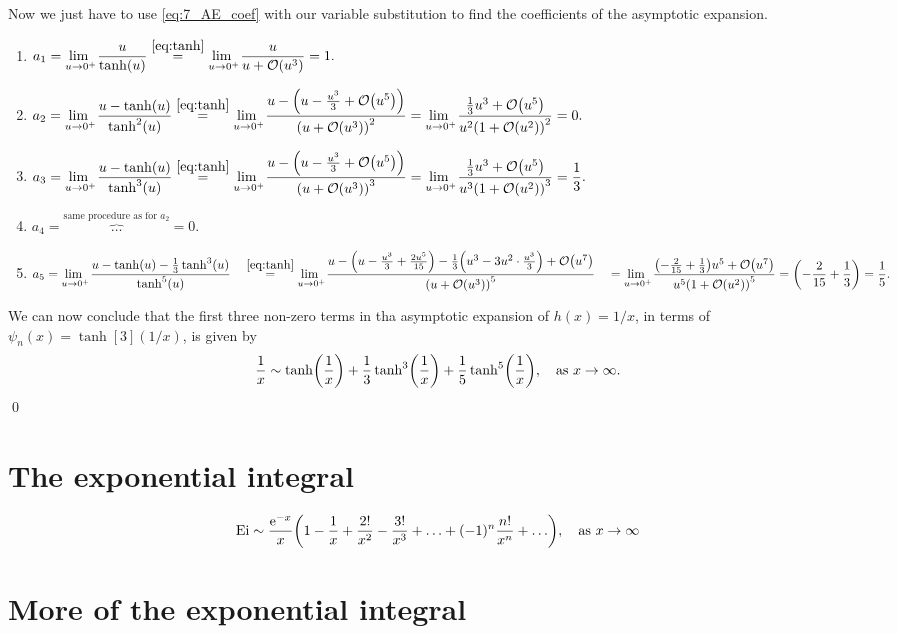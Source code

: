 \documentclass[11pt,letter, swedish, english
]{article}
\newcommand{\Ei}{\ensuremath\mathrm{Ei}}
\begin{document}
Now we just have to use \eqref{eq:7_AE_coef} with our variable
substitution to find the coefficients of the asymptotic expansion.
\begin{enumerate}
\item $\displaystyle a_1=\limu\frac{u}{\tanh(u)}
\stackrel{\eqref{eq:tanh}}{=}\limu \frac{u}{u+\order{u^3}} = 1.
$
\item $\displaystyle a_2=\limu\frac{u-\tanh(u)}{\tanh^2(u)}
\stackrel{\eqref{eq:tanh}}{=}\limu 
\frac{u-\qty(u-\frac{u^3}{3} + \order{u^5})}{\qty(u+\order{u^3})^2} 
=\limu 
\frac{\frac{1}{3}u^3 + \order{u^5}}{u^2\qty(1+\order{u^2})^2}= 0.
$
\item $\displaystyle a_3=\limu\frac{u-\tanh(u)}{\tanh^3(u)}
\stackrel{\eqref{eq:tanh}}{=}\limu 
\frac{u-\qty(u-\frac{u^3}{3} + \order{u^5})}{\qty(u+\order{u^3})^3} 
=\limu 
\frac{\frac{1}{3}u^3 + \order{u^5}}{u^3\qty(1+\order{u^2})^3}= \frac{1}{3}.
$
\item $\displaystyle a_4=
\overbrace{\ldots}^{\text{same procedure as for }a_2}= 0.
$
\item $\displaystyle a_5=\limu\frac{u-\tanh(u)-\frac{1}{3}\tanh^3(u)}{\tanh^5(u)}
\\\phantom{a_5}\stackrel{\eqref{eq:tanh}}{=}\limu 
\frac{u-\qty(u - \frac{u^3}{3} + \frac{2u^5}{15})
        -\frac{1}{3}\qty(u^3 - 3u^2\cdot\frac{u^3}{3}) +\order{u^7}}
     {\qty(u+\order{u^3})^5} 
\\\phantom{a_5}
=\limu 
\frac{\qty(-\frac{2}{15}+\frac{1}{3})u^5 + \order{u^7}}
     {u^5\qty(1+\order{u^2})^5}
= \qty(-\frac{2}{15}+\frac{1}{3}) = \frac{1}{5}.
$
\end{enumerate}
We can now conclude that the first three non-zero terms in tha
asymptotic expansion of $h(x)=1/x$, in terms of
$\psi_n(x)=\tanh[3](1/x)$, is given by
\begin{equation}
\frac{1}{x} \sim \tanh(\frac{1}{x}) 
+ \frac{1}{3}\tanh[3](\frac{1}{x})
+ \frac{1}{5}\tanh[5](\frac{1}{x}) \as x\to\infty.
\end{equation}
\qed





\section{The exponential integral}


\begin{equation}
\Ei \sim \frac{\ee^{-x}}{x}
\qty(1-\frac{1}{x}+\frac{2!}{x^2}-\frac{3!}{x^3}+\ldots+(-1)^n\frac{n!}{x^n}+\ldots)
\as x\to\infty
\end{equation}


\section{More of the exponential integral}
\end{document}
